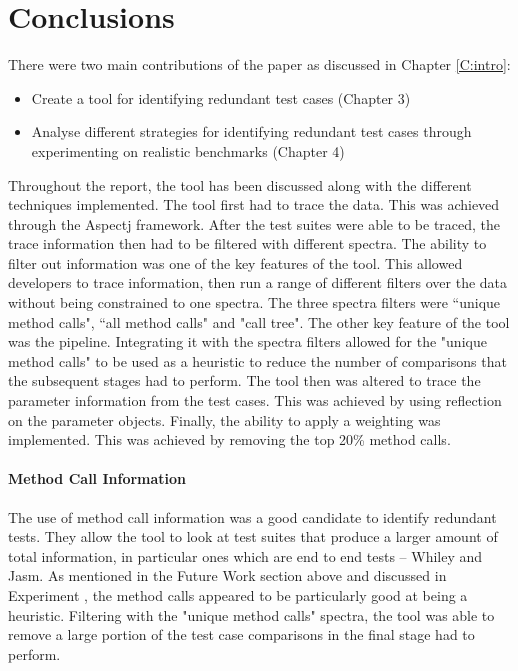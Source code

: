 \documentclass[11pt
              , a4paper
              , twoside
              , openright
              ]{report}
\newcommand{\rom}[1]{\uppercase\expandafter{\romannumeral #1\relax}}
\begin{document}
\section{Conclusions}

There were two main contributions of the paper as discussed in Chapter \ref{C:intro}:

\begin{itemize}
\item Create a tool for identifying redundant test cases (Chapter 3)
\item Analyse different strategies for identifying redundant test cases through experimenting on realistic benchmarks (Chapter 4)
\end{itemize}

Throughout the report, the tool has been discussed along with the different techniques implemented. The tool first had to trace the data. This was achieved through the Aspectj framework. After the test suites were able to be traced, the trace information then had to be filtered with different spectra. The ability to filter out information was one of the key features of the tool. This allowed developers to trace information, then run a range of different filters over the data without being constrained to one spectra. The three spectra filters were ``unique method calls", ``all method calls" and "call tree". The other key feature of the tool was the pipeline. Integrating it with the spectra filters allowed for the "unique method calls" to be used as a heuristic to reduce the number of comparisons that the subsequent stages had to perform. The tool then was altered to trace the parameter information from the test cases. This was achieved by using reflection on the parameter objects. Finally, the ability to apply a weighting was implemented. This was achieved by removing the top 20\% method calls.

\paragraph{Method Call Information}
The use of method call information was a good candidate to identify redundant tests. They allow the tool to look at test suites that produce a larger amount of total information, in particular ones which are end to end tests -- Whiley and Jasm. As mentioned in the Future Work section above and discussed in Experiment \rom{2}, the method calls appeared to be particularly good at being a heuristic. Filtering with the "unique method calls" spectra, the tool was able to remove a large portion of the test case comparisons in the final stage had to perform.
\end{document}
